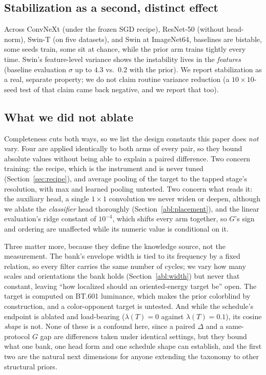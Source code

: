\subsection{Stabilization as a second, distinct effect}\label{abl:stab}
Across ConvNeXt (under the frozen SGD recipe), ResNet-50 (without
head-norm), Swin-T (on five datasets), and Swin at ImageNet64, baselines
are bistable, some seeds train, some sit at chance, while the prior
arm trains tightly every time. Swin's feature-level variance shows the
instability lives in the \emph{features} (baseline evaluation $\sigma$ up to
$4.3$ vs.\ $0.2$ with the prior). We report stabilization as a real,
separate property; we do not claim routine variance reduction (a
$10{\times}10$-seed test of that claim came back negative, and we report
that too).

\subsection{What we did not ablate}\label{abl:notablated}
Completeness cuts both ways, so we list the design constants this paper does
\emph{not} vary. Four are applied identically to both arms of every pair, so they bound absolute
values without being able to explain a paired difference. Two concern training:
the recipe, which is the instrument and is never tuned
(Section~\ref{sec:recipe}), and average pooling of the target to the tapped
stage's resolution, with max and learned pooling untested. Two concern what
reads it: the auxiliary head, a single $1{\times}1$ convolution we never widen
or deepen, although we ablate the \emph{classifier} head thoroughly
(Section~\ref{abl:placement}), and the linear evaluation's ridge constant of
$10^{-4}$, which shifts every arm together, so $G$'s sign and ordering are
unaffected while its numeric value is conditional on it.

 Three matter more, because they define the knowledge source, not the measurement. The bank's envelope width is tied to its frequency by a fixed
relation, so every filter carries the same number of cycles; we vary how many
scales and orientations the bank holds (Section~\ref{abl:width}) but never
that constant, leaving ``how localized should an oriented-energy target be''
open. The target is computed on BT.601 luminance, which makes the prior
colorblind by construction, and a color-opponent target is untested. And while
the schedule's endpoint is ablated and load-bearing ($\lambda(T)=0$ against
$\lambda(T)=0.1$), its cosine \emph{shape} is not. None of these is a confound
here, since a paired $\Delta$ and a same-protocol $G$ gap are differences
taken under identical settings, but they bound what one bank, one head form
and one schedule shape can establish, and the first two are the natural next
dimensions for anyone extending the taxonomy to other structural priors.


